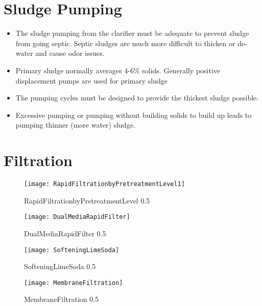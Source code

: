 \clearpage
\section{Sludge Pumping}

	\begin{itemize}
		\item The sludge pumping from the clarifier must be adequate 			to prevent sludge from going septic. Septic sludges are much 			more difficult to thicken or de-water and cause odor issues. 
		\item Primary sludge normally averages 4-6\% solids. 
		Generally positive displacement pumps are used for primary 				sludge
		\item The pumping cycles must be designed to provide the 				thickest sludge possible.
		\item Excessive pumping or pumping without building solids to 			build up leads to pumping thinner (more water) sludge.
	\end{itemize}


\section{Filtration}

\begin{figure}[h]
\begin{center}
\texttt{[image: RapidFiltrationbyPretreatmentLevel1]}
\caption{RapidFiltrationbyPretreatmentLevel 0.5}
\end{center}
\end{figure}

\begin{figure}[h]
\begin{center}
\texttt{[image: DualMediaRapidFilter]}
\caption{DualMediaRapidFilter 0.5}
\end{center}
\end{figure}

\begin{figure}[h]
\begin{center}
\texttt{[image: SofteningLimeSoda]}
\caption{SofteningLimeSoda 0.5}
\end{center}
\end{figure}

\begin{figure}[h]
\begin{center}
\texttt{[image: MembraneFiltration]}
\caption{MembraneFiltration 0.5}
\end{center}
\end{figure}
